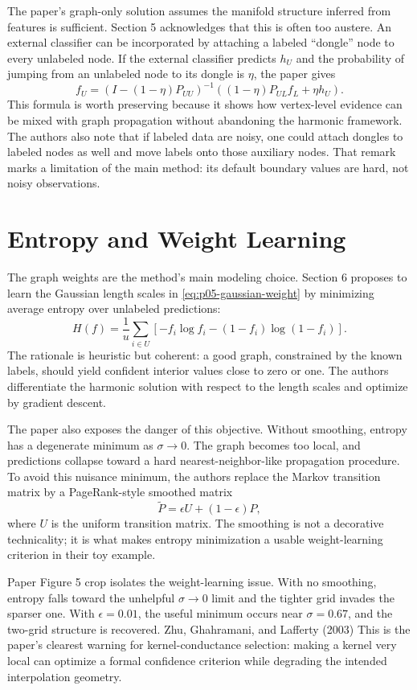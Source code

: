 \documentclass[11pt]{article}
\begin{document}
The paper's graph-only solution assumes the manifold structure inferred from
features is sufficient. Section 5 acknowledges that this is often too austere.
An external classifier can be incorporated by attaching a labeled ``dongle''
node to every unlabeled node. If the external classifier predicts \(h_U\) and
the probability of jumping from an unlabeled node to its dongle is \(\eta\), the
paper gives
\[
  f_U
  =
  \left(I-(1-\eta)P_{UU}\right)^{-1}
  \left((1-\eta)P_{UL}f_L+\eta h_U\right).
\]
This formula is worth preserving because it shows how vertex-level evidence can
be mixed with graph propagation without abandoning the harmonic framework. The
authors also note that if labeled data are noisy, one could attach dongles to
labeled nodes as well and move labels onto those auxiliary nodes. That remark
marks a limitation of the main method: its default boundary values are hard,
not noisy observations.

\section{Entropy and Weight Learning}

The graph weights are the method's main modeling choice. Section 6 proposes to
learn the Gaussian length scales in \eqref{eq:p05-gaussian-weight} by minimizing
average entropy over unlabeled predictions:
\[
  H(f)=\frac{1}{u}\sum_{i\in U}
  \left[-f_i\log f_i-(1-f_i)\log(1-f_i)\right].
\]
The rationale is heuristic but coherent: a good graph, constrained by the known
labels, should yield confident interior values close to zero or one. The
authors differentiate the harmonic solution with respect to the length scales
and optimize by gradient descent.

The paper also exposes the danger of this objective. Without smoothing, entropy
has a degenerate minimum as \(\sigma\to 0\). The graph becomes too local, and
predictions collapse toward a hard nearest-neighbor-like propagation procedure.
To avoid this nuisance minimum, the authors replace the Markov transition matrix
by a PageRank-style smoothed matrix
\[
  \widetilde{P}=\epsilon U+(1-\epsilon)P,
\]
where \(U\) is the uniform transition matrix. The smoothing is not a decorative
technicality; it is what makes entropy minimization a usable weight-learning
criterion in their toy example.

{Paper Figure 5 crop isolates the weight-learning issue. With no
smoothing, entropy falls toward the unhelpful \(\sigma\to 0\) limit and the
tighter grid invades the sparser one. With \(\epsilon=0.01\), the useful
minimum occurs near \(\sigma=0.67\), and the two-grid structure is recovered.}
{Zhu, Ghahramani, and Lafferty (2003)}
{This is the paper's clearest warning for kernel-conductance selection: making
a kernel very local can optimize a formal confidence criterion while degrading
the intended interpolation geometry.}
\end{document}
